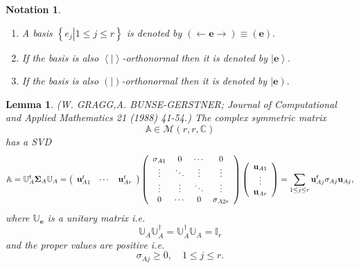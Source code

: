 \documentclass[aps,preprint]{revtex4}%
\newtheorem{lemma}[theorem]{Lemma}
\newtheorem{notation}[theorem]{Notation}
\begin{document}
\begin{notation}
\begin{enumerate}
\item A basis $\left\{  \left.  e_{j}\right\vert 1\leq j\leq r\right\}  $ is
denoted by $\left(  \longleftarrow\mathbf{e\rightarrow}\right)  \equiv\left(
\mathbf{e}\right)  .$

\item If the basis is also $\left\langle \left.  {}\right\vert \right\rangle
$-orthonormal then it is denoted by $\left\vert \mathbf{e}\right\rangle .$

\item If the basis is also $\left(  \left.  {}\right\vert \right)
$-orthonormal then it is denoted by $\left\vert \mathbf{e}\right)  .$
\end{enumerate}
\end{notation}

\begin{lemma}
(W. GRAGG,\thinspace A. BUNSE-GERSTNER; Journal of Computational and Applied
Mathematics 21 (1988) 41-54.) The \emph{complex symmetric} \emph{matrix}%
\begin{equation}
\mathbb{A}\in\mathcal{M}\left(  r,r,\mathbb{C}\right)
\end{equation}
has a SVD
\begin{equation}
\mathbb{A}=\mathbb{U}_{A}^{t}\mathbf{\Sigma}_{A}\mathbb{U}_{A}=\left(
\begin{array}
[c]{ccc}%
\mathbf{u}_{A1}^{t} & \cdots & \mathbf{u}_{Ar}^{t}%
\end{array}
\right)  \left(
\begin{array}
[c]{cccc}%
\sigma_{A1} & 0 & \cdots & 0\\
\vdots & \ddots & \vdots & \vdots\\
\vdots & \vdots & \ddots & \vdots\\
0 & \cdots & 0 & \sigma_{A2r}%
\end{array}
\right)  \left(
\begin{array}
[c]{c}%
\mathbf{u}_{A1}\\
\vdots\\
\mathbf{u}_{Ar}%
\end{array}
\right)  =\sum_{1\leq j\leq r}\mathbf{u}_{Aj}^{t}\sigma_{Aj}\mathbf{u}_{Aj},
\end{equation}
where $\mathbb{U}_{\mathbf{e}}$ is a unitary matrix i.e.
\begin{equation}
\mathbb{U}_{A}\mathbb{U}_{A}^{\dagger}=\mathbb{U}_{A}^{\dagger}\mathbb{U}%
_{A}=\mathbb{I}_{r}%
\end{equation}
and the proper values are positive i.e.
\begin{equation}
\sigma_{Aj}\geq0,\quad1\leq j\leq r.
\end{equation}

\end{lemma}
\end{document}
